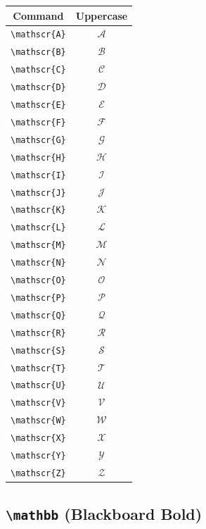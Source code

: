 \documentclass[12pt,a4paper]{article}
\begin{document}
\begin{longtable}{|c|c|}
\hline
\textbf{Command} & \textbf{Uppercase} \\
\hline
\verb|\mathscr{A}| & $\mathscr{A}$ \\ %
\verb|\mathscr{B}| & $\mathscr{B}$ \\ %
\verb|\mathscr{C}| & $\mathscr{C}$ \\ %
\verb|\mathscr{D}| & $\mathscr{D}$ \\ %
\verb|\mathscr{E}| & $\mathscr{E}$ \\ %
\verb|\mathscr{F}| & $\mathscr{F}$ \\ %
\verb|\mathscr{G}| & $\mathscr{G}$ \\ %
\verb|\mathscr{H}| & $\mathscr{H}$ \\ %
\verb|\mathscr{I}| & $\mathscr{I}$ \\ %
\verb|\mathscr{J}| & $\mathscr{J}$ \\ %
\verb|\mathscr{K}| & $\mathscr{K}$ \\ %
\verb|\mathscr{L}| & $\mathscr{L}$ \\ %
\verb|\mathscr{M}| & $\mathscr{M}$ \\ %
\verb|\mathscr{N}| & $\mathscr{N}$ \\ %
\verb|\mathscr{O}| & $\mathscr{O}$ \\ %
\verb|\mathscr{P}| & $\mathscr{P}$ \\ %
\verb|\mathscr{Q}| & $\mathscr{Q}$ \\ %
\verb|\mathscr{R}| & $\mathscr{R}$ \\ %
\verb|\mathscr{S}| & $\mathscr{S}$ \\ %
\verb|\mathscr{T}| & $\mathscr{T}$ \\ %
\verb|\mathscr{U}| & $\mathscr{U}$ \\ %
\verb|\mathscr{V}| & $\mathscr{V}$ \\ %
\verb|\mathscr{W}| & $\mathscr{W}$ \\ %
\verb|\mathscr{X}| & $\mathscr{X}$ \\ %
\verb|\mathscr{Y}| & $\mathscr{Y}$ \\ %
\verb|\mathscr{Z}| & $\mathscr{Z}$ \\ %
\hline
\end{longtable}

\newpage

\subsection*{\texttt{\textbackslash{}mathbb} (Blackboard Bold)}
\end{document}
